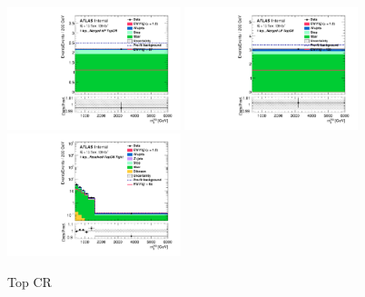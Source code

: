 \begin{figure}[H]
    \centering
    \includegraphics[width=0.45\textwidth]{figures/PostFit/Region_disttagMjj_DCRTopHP_BMin0_J0_incJet1_L1_T0_incFat1_Y6051_incTag1_Fat1_GlobalFit_unconditionnal_mu1}
    \includegraphics[width=0.45\textwidth]{figures/PostFit/Region_disttagMjj_DCRTopLP_BMin0_J0_incJet1_L1_T0_incFat1_Y6051_incTag1_Fat1_GlobalFit_unconditionnal_mu1}
    \includegraphics[width=0.45\textwidth]{figures/PostFit/Region_disttagMjj_DCRTopTight_BMin0_T0_Y6051_incTag1_J2_L1_incJet1_GlobalFit_unconditionnal_mu1log} 
    \caption{Top CR}
    \label{fig:postCR}
\end{figure}

